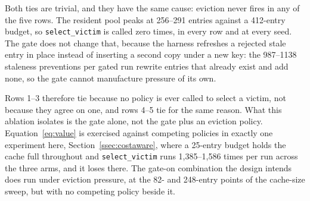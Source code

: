 \documentclass[10pt]{article}
\begin{document}
Both ties are trivial, and they have the same cause: eviction never fires in any of the
five rows. The resident pool peaks at 256--291 entries against a 412-entry budget, so
\texttt{select\_victim} is called zero times, in every row and at every seed. The gate does
not change that, because the harness refreshes a rejected stale entry in place instead of
inserting a second copy under a new key: the 987--1138 staleness preventions per gated run
rewrite entries that already exist and add none, so the gate cannot manufacture pressure of
its own.

Rows 1--3 therefore tie because no policy is ever called to select a victim, not because they
agree on one, and rows 4--5 tie for the same reason. What this ablation isolates is the gate
alone, not the gate plus an eviction policy. Equation~\ref{eq:value} is exercised against
competing policies in exactly one experiment here, Section~\ref{ssec:costaware}, where a
25-entry budget holds the cache full throughout and \texttt{select\_victim} runs
1{,}385--1{,}586 times per run across the three arms, and it loses there. The gate-on
combination the design intends does run under eviction pressure, at the 82- and 248-entry
points of the
cache-size sweep, but with no competing policy beside it.
\end{document}
